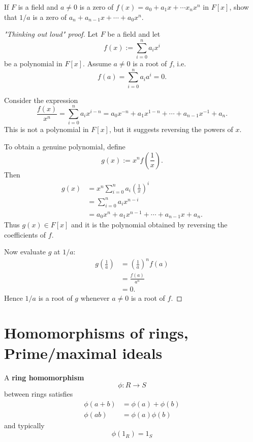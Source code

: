  \begin{prob}
     If $F$ is a field and $a \neq 0$ is a zero of $f(x) = 
     a_0 + a_1x+\cdots x_nx^n$ in $F[x]$, show that 
     $1/a$ is a zero of $a_n + a_{n-1}x + \cdots + 
     a_0x^n$.
 \end{prob}
\begin{proof}["Thinking out loud" proof]
    Let $F$ be a field and let
    \[
        f(x) := \sum_{i=0}^{n} a_i x^i
    \]
    be a polynomial in $F[x]$. Assume $a \neq 0$ is a root of $f$, 
    i.e.
    \[
        f(a) = \sum_{i=0}^{n} a_i a^i = 0 .
    \]

    Consider the expression
    \[
        \frac{f(x)}{x^n}
        =
        \sum_{i=0}^{n} a_i x^{i-n}
        =
        a_0 x^{-n} + a_1 x^{1-n} + \cdots + a_{n-1} x^{-1} + a_n .
    \]
    This is not a polynomial in $F[x]$, but it suggests reversing the
    powers of $x$.

    To obtain a genuine polynomial, define
    \[
        g(x) := x^n f\!\left(\frac{1}{x}\right).
    \]
    Then
    \[
        \begin{aligned}
            g(x)
    &= x^n \sum_{i=0}^{n} a_i \left(\frac{1}{x}\right)^i \\
    &= \sum_{i=0}^{n} a_i x^{n-i} \\
    &= a_0 x^n + a_1 x^{n-1} + \cdots + a_{n-1}x + a_n .
        \end{aligned}
    \]
    Thus $g(x) \in F[x]$ and it is the polynomial obtained by 
    reversing the
    coefficients of $f$.

    Now evaluate $g$ at $1/a$:
    \[
        \begin{aligned}
            g\!\left(\frac{1}{a}\right)
    &= \left(\frac{1}{a}\right)^n f(a) \\
    &= \frac{f(a)}{a^n} \\
    &= 0 .
        \end{aligned}
    \]
    Hence $1/a$ is a root of $g$ whenever $a \neq 0$ is a root of $f$.
\end{proof}

\newpage 
\section{Homomorphisms of rings, Prime/maximal ideals}
\begin{defn}
    A \textbf{ring homomorphism} 
    \[
        \phi : R \to S
    \]
    between rings satisfies 
    \begin{align*}
        \phi(a+b) &= \phi(a) + \phi(b) \\ 
        \phi(ab) &= \phi(a)\phi(b)
    \end{align*}
    and typically 
    \[
        \phi(1_R) = 1_S
    \]
\end{defn}

